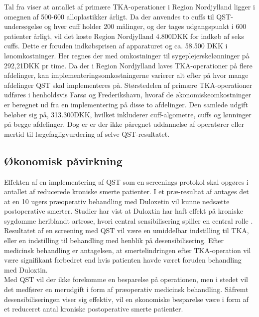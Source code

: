 Tal fra  viser at antallet af primære TKA-operationer i Region Nordjylland ligger i omegnen af 500-600 alloplastikker årligt. Da der anvendes to cuffs til QST-undersøgelse og hver cuff holder 200 målinger, og der tages udgangspunkt i 600 patienter årligt, vil det koste Region Nordjylland 4.800DKK for indkøb af seks cuffs. Dette er foruden indkøbsprisen af apparaturet og ca. 58.500 DKK i lønomkostninger. Her regnes der med omkostninger til sygeplejerskelønninger på 292,21DKK pr time. \citep{DST1} \citep{DST2} Da der i Region Nordjylland laves TKA-operationer på flere afdelinger, kan implementeringsomkostningerne varierer alt efter på hvor mange afdelinger QST skal implementeres på. Størstedelen af primære TKA-operationer udføres i henholdsvis Farsø og Frederikshavn, hvoraf de økonomiskeomkostninger er beregnet ud fra en implementering på disse to afdelinger. Den samlede udgift beløber sig på, 313.300DKK, hvilket inkluderer cuff-algometre, cuffs og lønninger på begge afdelinger. Dog er er der ikke påregnet uddannelse af operatører eller mertid til lægefagligvurdering af selve QST-resultatet.

\subsection{Økonomisk påvirkning} 
Effekten af en implementering af QST som en screenings protokol skal opgøres i antallet af reducerede kroniske smerte patienter. I et præ-resultat af  antages det at en 10 ugers præoperativ behandling med Duloxetin vil kunne nedsætte postoperative smerter. Studier har vist at Duloxtin har haft effekt på kroniske sygdomme heriblandt artrose, hvori central sensibilisering spiller en central rolle \citep{Blikman2016}. Resultatet af en screening med QST vil være en umiddelbar indstilling til TKA, eller en indstilling til behandling med henblik på desensibilisering. Efter medicinsk behandling er antagelsen, at smertelindringen efter TKA-operation vil være signifikant forbedret end hvis patienten havde været foruden behandling med Duloxtin. \citep{Blikman2016} \\
Med QST vil der ikke forekomme en besparelse på operationen, men i stedet vil det medfører en merudgift i form af præoperativ medicinsk behandling. Såfremt desensibiliseringen viser sig effektiv, vil en økonomiske besparelse være i form af et reduceret antal kroniske postoperative smerte patienter.

